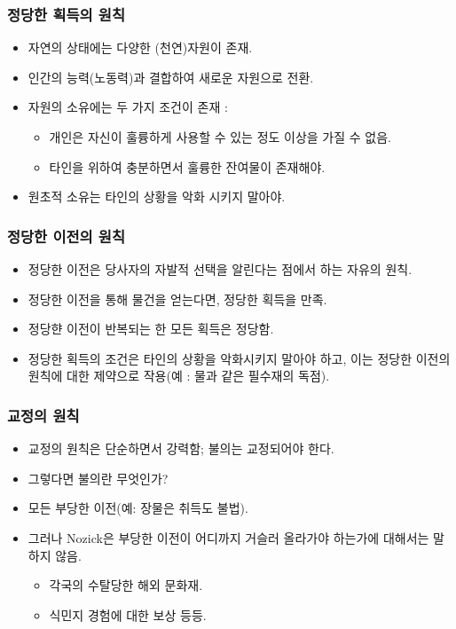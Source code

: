 \documentclass[aspectratio=169,xcolor=dvipsnames,handout]{beamer}
\begin{document}
\begin{frame}[<+->]
\frametitle{정당한 획득의 원칙}
    \begin{itemize}
        \item 자연의 상태에는 다양한 (천연)자원이 존재.
        \item 인간의 능력(노동력)과 결합하여 새로운 자원으로 전환.
        \item 자원의 소유에는 두 가지 조건이 존재 :
        \begin{itemize}
            \item 개인은 자신이 훌륭하게 사용할 수 있는 정도 이상을 가질 수 없음.
            \item 타인을 위하여 충분하면서 훌륭한 잔여물이 존재해야.
        \end{itemize}
        \item 원초적 소유는 타인의 상황을 악화 시키지 말아야.
    \end{itemize}
\end{frame}

\begin{frame}[<+->]
\frametitle{정당한 이전의 원칙}
    \begin{itemize}
        \item 정당한 이전은 당사자의 자발적 선택을 알린다는 점에서 하는 자유의 원칙.
        \item 정당한 이전을 통해 물건을 얻는다면, 정당한 획득을 만족.
        \item 정당햔 이전이 반복되는 한 모든 획득은 정당함.
        \item 정당한 획득의 조건은 타인의 상황을 악화시키지 말아야 하고, 이는 정당한 이전의 원칙에 대한 제약으로 작용(예 : 물과 같은 필수재의 독점).
    \end{itemize}
\end{frame}

\begin{frame}[<+->]
\frametitle{교정의 원칙}
    \begin{itemize}
        \item 교정의 원칙은 단순하면서 강력함; 불의는 교정되어야 한다.
        \item 그렇다면 불의란 무엇인가?
        \item 모든 부당한 이전(예: 장물은 취득도 불법).
        \item 그러나 Nozick은 부당한 이전이 어디까지 거슬러 올라가야 하는가에 대해서는 말하지 않음.
        \begin{itemize}
            \item 각국의 수탈당한 해외 문화재.
            \item 식민지 경험에 대한 보상 등등.
        \end{itemize}
    \end{itemize}
\end{frame}
\end{document}
